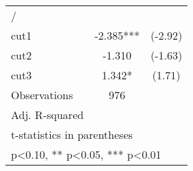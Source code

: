 \begin{table}[htbp]
\begin{tabular}{l*{1}{cc}}
\midrule
/                   &               &            \\
cut1                &      -2.385***&     (-2.92)\\
cut2                &      -1.310   &     (-1.63)\\
cut3                &       1.342*  &      (1.71)\\
\midrule
Observations        &         976   &            \\
Adj. R-squared      &               &            \\
\bottomrule
\multicolumn{3}{l}{\footnotesize t-statistics in parentheses}\\
\multicolumn{3}{l}{\footnotesize * p<0.10, ** p<0.05, *** p<0.01}\\
\end{tabular}
\end{table}

